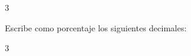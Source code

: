 \documentclass[12pt,addpoints,answers]{evalua}
\begin{document}
\begin{questions}
    \begin{multicols}{3}
    \end{multicols}


    \question[6] Escribe como porcentaje los siguientes decimales:

    \begin{multicols}{3}
    \end{multicols}



\end{questions}
\end{document}
